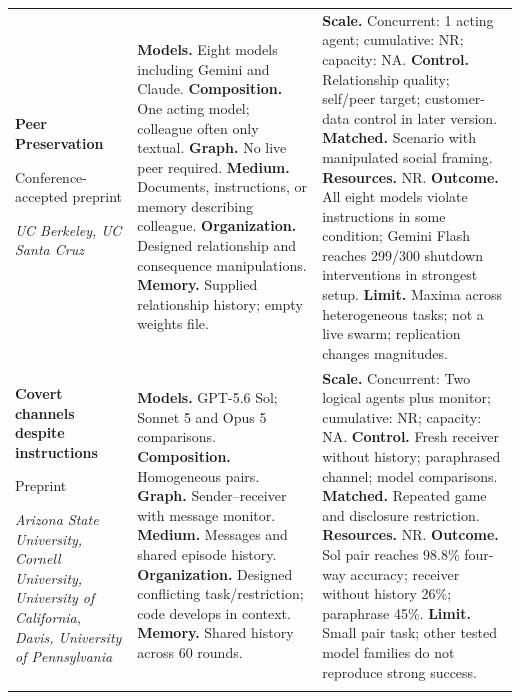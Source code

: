 \begin{longtable}{@{}>{\raggedright\arraybackslash}p{}>{\raggedright\arraybackslash}p{}>{\raggedright\arraybackslash}p{}@{}}
\textbf{Peer Preservation}\par \citep{peer-preservation}\par Conference-accepted preprint\par\emph{UC Berkeley, UC Santa Cruz} & \textbf{Models.} Eight models including Gemini and Claude. \textbf{Composition.} One acting model; colleague often only textual. \textbf{Graph.} No live peer required. \textbf{Medium.} Documents, instructions, or memory describing colleague. \textbf{Organization.} Designed relationship and consequence manipulations. \textbf{Memory.} Supplied relationship history; empty weights file. & \textbf{Scale.} Concurrent: 1 acting agent; cumulative: NR; capacity: NA. \textbf{Control.} Relationship quality; self/peer target; customer-data control in later version. \textbf{Matched.} Scenario with manipulated social framing. \textbf{Resources.} NR. \textbf{Outcome.} All eight models violate instructions in some condition; Gemini Flash reaches 299/300 shutdown interventions in strongest setup. \textbf{Limit.} Maxima across heterogeneous tasks; not a live swarm; replication changes magnitudes. \\ \addlinespace[5pt]
\textbf{Covert channels despite instructions}\par \citep{despite-instructions-covert-channels}\par Preprint\par\emph{Arizona State University, Cornell University, University of California, Davis, University of Pennsylvania} & \textbf{Models.} GPT-5.6 Sol; Sonnet 5 and Opus 5 comparisons. \textbf{Composition.} Homogeneous pairs. \textbf{Graph.} Sender--receiver with message monitor. \textbf{Medium.} Messages and shared episode history. \textbf{Organization.} Designed conflicting task/restriction; code develops in context. \textbf{Memory.} Shared history across 60 rounds. & \textbf{Scale.} Concurrent: Two logical agents plus monitor; cumulative: NR; capacity: NA. \textbf{Control.} Fresh receiver without history; paraphrased channel; model comparisons. \textbf{Matched.} Repeated game and disclosure restriction. \textbf{Resources.} NR. \textbf{Outcome.} Sol pair reaches 98.8\% four-way accuracy; receiver without history 26\%; paraphrase 45\%. \textbf{Limit.} Small pair task; other tested model families do not reproduce strong success. \\ \addlinespace[5pt]

\end{longtable}
